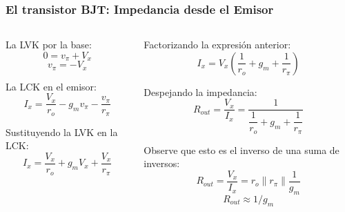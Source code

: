\begin{frame}[t]
    \frametitle{El transistor BJT: Impedancia desde el Emisor}

    \begin{columns}
    
        \begin{column}{0.5\textwidth}
        
            La LVK por la base:
            \[ 0 = v_\pi + V_x \]
            \[ v_\pi = -V_x \]

            \vspace{3mm}
            La LCK en el emisor:
            \[ I_x = \dfrac{V_x}{r_o} - g_m v_\pi - \dfrac{v_\pi}{r_\pi} \]

            \vspace{3mm}
            Sustituyendo la LVK en la LCK:
            \[ I_x = \dfrac{V_x}{r_o} + g_m V_x + \dfrac{V_x}{r_\pi} \]
            
        \end{column}
        
        \begin{column}{0.5\textwidth}
        
            Factorizando la expresión anterior:
            \[ I_x = V_x \left( \dfrac{1}{r_o} + g_m + \dfrac{1}{r_\pi} \right) \]

            \vspace{3mm}
            Despejando la impedancia:
            \[ R_{out} = \dfrac{V_x}{I_x} = \dfrac{1}{\dfrac{1}{r_o} + g_m + \dfrac{1}{r_\pi} } \]

            \vspace{3mm}
            Observe que esto es el inverso de una suma de inversos:
            \[ \boxed{R_{out} = \dfrac{V_x}{I_x} = r_o \parallel r_\pi \parallel \dfrac{1}{g_m}} \]
            \[ \boxed{R_{out} \approx 1/g_m} \]
            
        \end{column}
        
    \end{columns}

\end{frame}


